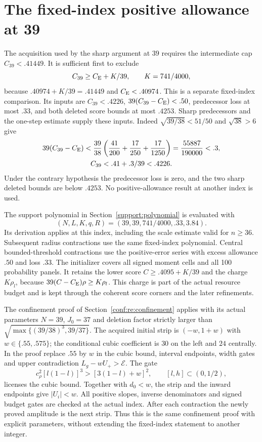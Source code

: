 \section{The fixed-index positive allowance at 39}
\label{ext:positive39-local}

The acquisition used by the sharp argument at $39$ requires the
intermediate cap $C_{39}<.41449$. It is sufficient first to exclude
\[
 C_{39}\ge C_{\mathrm E}+K/39,\qquad K=741/4000,
\]
because $.40974+K/39=.41449$ and $C_{\mathrm E}<.40974$.
This is a separate fixed-index comparison. Its inputs are
$C_{39}<.4226$, $39(C_{39}-C_{\mathrm E})<.50$, predecessor loss at most
$.33$, and both deleted score bounds at most $.4253$.
Sharp predecessors and the one-step estimate supply these inputs.
Indeed $\sqrt{39/38}<51/50$ and $\sqrt{38}>6$ give
\[
 \begin{gathered}
 39(C_{39}-C_{\mathrm E})<\frac{39}{38}
       \left(\frac{41}{200}+\frac{17}{250}+\frac{17}{1250}\right)
 =\frac{55887}{190000}<.3,\\
 C_{39}<.41+.3/39<.4226.
 \end{gathered}
\]
Under the contrary hypothesis the predecessor loss is zero, and the
two sharp deleted bounds are below $.4253$.
No positive-allowance result at another index is used.

The support polynomial in Section~\ref{support:polynomial} is
evaluated with
\[
             (N,L,K,q,R)=(39,39,741/4000,.33,3.84).
\]
Its derivation applies at this index, including the scale estimate
valid for $n\ge36$. Subsequent radius contractions use the same
fixed-index polynomial. Central bounded-threshold contractions use
the positive-error series with excess allowance $.50$ and loss $.33$.
The initializer covers all signed moment cells and all 100 probability
panels. It retains the lower score $C\ge.4095+K/39$ and the
charge $K\rho_l$, because $39(C-C_{\mathrm E})\rho\ge K\rho_l$.
This charge is part of the actual resource budget and is kept through
the coherent score corners and the later refinements.

The confinement proof of Section~\ref{conf:re:confinement} applies
with its actual parameters $N=39$, $J_0=37$ and deletion factor
strictly larger than $\sqrt{\max\{(39/38)^3,39/37\}}$.
The acquired initial strip is $(-w,1+w)$ with
$w\in\{.55,.575\}$; the conditional cubic coefficient is $30$
on the left and $24$ centrally. In the proof replace $.55$ by $w$
in the cubic bound, interval endpoints, width gates and upper
contradiction $L_g-wU_+>\mathcal E$. The gate
\[
 c_\rho^2[l(1-l)]^3>[3(1-l)+w]^2,
 \qquad [l,h]\subset(0,1/2),
\]
licenses the cubic bound. Together with $d_0<w$, the strip and the
inward endpoints give $|U_i|<w$. All positive slopes, inverse
denominators and signed budget gates are checked at the actual
index. After each contraction the newly proved amplitude is the
next strip. Thus this is the same confinement proof with explicit
parameters, without extending the fixed-index statement to another
integer.

